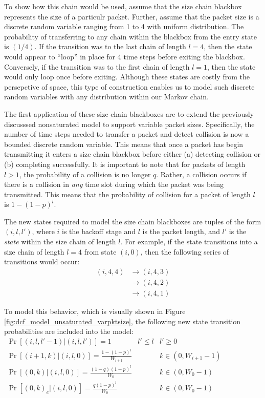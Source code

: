 \documentclass{llncs}
\begin{document}
To show how this chain would be used, assume that the size chain blackbox represents the size of a particulr packet. Further, assume that the packet size is a discrete random variable ranging from 1 to 4 with uniform distribution. The probability of transferring to any chain within the blackbox from the entry state is $(1/4)$. If the transition was to the last chain of length $l = 4$, then the state would appear to ``loop'' in place for 4 time steps before exiting the blackbox. Conversely, if the transition was to the first chain of length $l = 1$, then the state would only loop once before exiting. Although these states are costly from the persepctive of space, this type of construction enables us to model such discrete random variables with any distribution within our Markov chain. 

The first application of these size chain blackboxes are to extend the previously discusssed nonsaturated model to support variable packet sizes. Specifically, the number of time steps needed to transfer a packet and detect collision is now a bounded discrete random variable. This means that once a packet has begin transmitting it enters a size chain blackbox before either (a) detecting collision or (b) completing successfully. It is important to note that for packets of length $l > 1$, the probability of a collision is no longer $q$. Rather, a collision occurs if there is a collision in \emph{any} time slot during which the packet was being transmitted. This means that the probability of collision for a packet of length $l$ is $1 - (1 - p)^l$. 

The new states required to model the size chain blackboxes are tuples of the form $(i, l, l')$, where $i$ is the backoff stage and $l$ is the packet length, and $l'$ is the \emph{state} within the size chain of length $l$. For example, if the state transitions into a size chain of length $l = 4$ from state $(i, 0)$, then the following series of transitions would occur: 
\begin{align*}
(i, 4, 4) & \to (i, 4, 3) \\
& \to (i, 4, 2) \\
& \to (i, 4, 1)
\end{align*}

To model this behavior, which is visually shown in Figure \ref{fig:dcf_model_unsaturated_varpktsize}, the following new state transition probabilities are included into the model:
\begin{math}
\begin{array}{lll}
\Pr[(i,l,l'-1) | (i,l,l')] = 1 & l' \leq l & l' \geq 0 \\
\Pr[(i+1,k) | (i,l,0)] = \frac{1 - (1 - p)^l}{W_{i+1}} & ~ & k \in (0, W_{i+1} - 1) \\
\Pr[(0,k) | (i,l,0)] = \frac{(1 - q)(1 - p)^l}{W_0} & ~ & k \in (0, W_{0} - 1) \\
\Pr[(0,k)_e | (i,l,0)] = \frac{q(1 - p)^l}{W_0} & ~ & k \in (0, W_{0} - 1) \\
\end{array}
\end{math}
\end{document}
